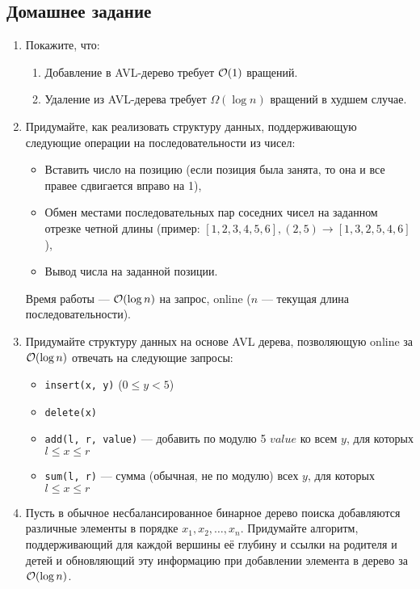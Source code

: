 \subsection{Домашнее задание}
\begin{enumerate}
  \item
    Покажите, что:
    \begin{enumerate}
      \item Добавление в AVL-дерево требует $\mathcal{O}(1)$ вращений.
      \item Удаление из AVL-дерева требует $\Omega(\log n)$ вращений в худшем случае.
    \end{enumerate}

  \item
    Придумайте, как реализовать структуру данных, поддерживающую следующие операции на последовательности из чисел:
    \begin{itemize}
      \item Вставить число на позицию (если позиция была занята, то она и все правее
        сдвигается вправо на 1),
      \item Обмен местами последовательных пар соседних чисел на заданном отрезке четной длины
             (пример: $[1,2,3,4,5,6], (2,5) \rightarrow [1,3,2,5,4,6]$),
      \item Вывод числа на заданной позиции.
    \end{itemize}
    Время работы --- $\mathcal{O}(\log{n})$ на запрос, online ($n$ --- текущая длина последовательности).

  \item {}
    Придумайте структуру данных на основе AVL дерева, позволяющую online за $\mathcal{O}(\log n)$ отвечать на следующие запросы:
	\begin{itemize}
	  \item \texttt{insert(x, y)} ($0 \le y < 5$)
      \item \texttt{delete(x)}
      \item \texttt{add(l, r, value)} --- добавить по модулю 5 $value$ ко
        всем $y$, для которых $l \le x \le r$
      \item \texttt{sum(l, r)} --- сумма (обычная, не по модулю) всех $y$,
        для которых $l \le x \le r$
    \end{itemize}

  \item
    Пусть в обычное несбалансированное бинарное дерево поиска добавляются различные элементы в порядке $x_1, x_2, \dots, x_n$. 
    Придумайте алгоритм, поддерживающий для каждой вершины её глубину и ссылки на родителя и детей
    и обновляющий эту информацию при добавлении элемента в дерево за $\mathcal{O}(\log n)$.
    

\end{enumerate}
